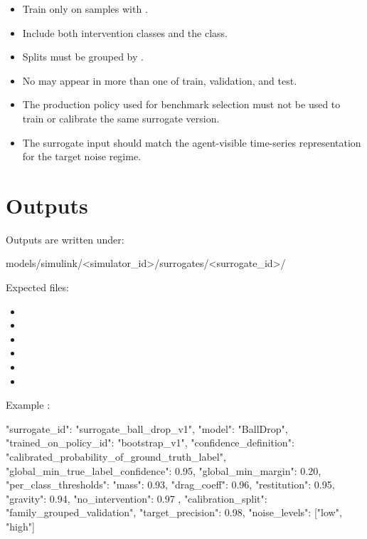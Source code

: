 \documentclass[11pt]{article}
\begin{document}
\begin{itemize}
\item Train only on samples with .
\item Include both intervention classes and the  class.
\item Splits must be grouped by .
\item No  may appear in more than one of train, validation, and test.
\item The production policy used for benchmark selection must not be used to train or calibrate the same surrogate version.
\item The surrogate input should match the agent-visible time-series representation for the target noise regime.
\end{itemize}

\section*{Outputs}

Outputs are written under:

\begin{DocCode}
models/simulink/<simulator_id>/surrogates/<surrogate_id>/
\end{DocCode}

Expected files:

\begin{itemize}
\item {}
\item {}
\item {}
\item {}
\item {}
\item {}
\end{itemize}

Example :

\begin{DocCode}
{
  "surrogate_id": "surrogate_ball_drop_v1",
  "model": "BallDrop",
  "trained_on_policy_id": "bootstrap_v1",
  "confidence_definition": "calibrated_probability_of_ground_truth_label",
  "global_min_true_label_confidence": 0.95,
  "global_min_margin": 0.20,
  "per_class_thresholds": {
    "mass": 0.93,
    "drag_coeff": 0.96,
    "restitution": 0.95,
    "gravity": 0.94,
    "no_intervention": 0.97
  },
  "calibration_split": "family_grouped_validation",
  "target_precision": 0.98,
  "noise_levels": ["low", "high"]
}
\end{DocCode}
\end{document}
